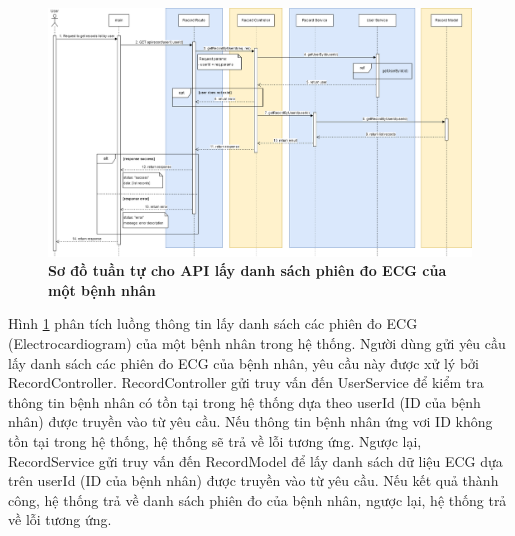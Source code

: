 \begin{figure}[H]
  \centering
  \includegraphics[scale=0.3]{Images/sequence_api/getRecordsByUser.png}
  \caption[Sơ đồ tuần tự cho API lấy danh sách phiên đo ECG của một bệnh nhân ]{\bfseries \fontsize{12pt}{0pt}
  \selectfont Sơ đồ tuần tự cho API lấy danh sách phiên đo ECG của một bệnh nhân }
  \label{api_getRecordsByUser} %
\end{figure}
Hình \ref{api_getRecordsByUser} phân tích luồng thông tin lấy danh sách các phiên đo ECG (Electrocardiogram) của một bệnh nhân trong hệ thống. Người dùng gửi yêu cầu lấy danh sách các phiên đo ECG của bệnh nhân, 
yêu cầu này được xử lý bởi RecordController. RecordController gửi truy vấn đến UserService để kiểm tra thông tin bệnh nhân có tồn tại trong hệ thống dựa theo userId (ID của bệnh nhân) được truyền vào từ yêu cầu. Nếu thông tin bệnh nhân ứng vơi ID không tồn tại trong hệ thống, hệ thống sẽ
trả về lỗi tương ứng. Ngược lại, RecordService gửi truy vấn đến RecordModel để lấy danh sách dữ liệu ECG dựa trên userId (ID của bệnh nhân) được truyền vào từ yêu cầu. 
Nếu kết quả thành công, hệ thống trả về danh sách phiên đo của bệnh nhân, ngược lại, hệ thống trả về lỗi tương ứng.

